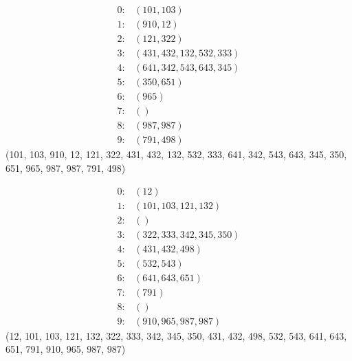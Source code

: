 \documentclass{article}
\begin{document}
\begin{align*}
    0: & \left(101, 103\right)                \\
    1: & \left(910, 12\right)                 \\
    2: & \left(121, 322\right)                \\
    3: & \left(431, 432, 132, 532, 333\right) \\
    4: & \left(641, 342, 543, 643, 345\right) \\
    5: & \left(350, 651\right)                \\
    6: & \left(965\right)                     \\
    7: & \left(\right)                        \\
    8: & \left(987, 987\right)                \\
    9: & \left(791, 498\right)
\end{align*}
(101, 103, 910, 12, 121, 322, 431, 432, 132, 532, 333, 641, 342, 543, 643, 345, 350, 651, 965, 987, 987, 791, 498)

\begin{align*}
    0: & \left(12\right)                      \\
    1: & \left(101, 103, 121, 132\right)      \\
    2: & \left(\right)                        \\
    3: & \left(322, 333, 342, 345, 350\right) \\
    4: & \left(431, 432, 498\right)           \\
    5: & \left(532, 543\right)                \\
    6: & \left(641, 643, 651\right)           \\
    7: & \left(791\right)                     \\
    8: & \left(\right)                        \\
    9: & \left(910, 965, 987, 987\right)
\end{align*}
(12, 101, 103, 121, 132, 322, 333, 342, 345, 350, 431, 432, 498, 532, 543, 641, 643, 651, 791, 910, 965, 987, 987)

\pagebreak
\end{document}
